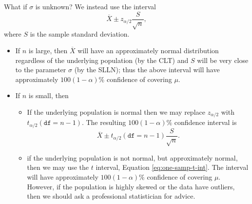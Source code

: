 \documentclass[captions=tableheading]{scrbook}
\begin{document}
\begin{rem}
What if \(\sigma\) is unknown? We instead use the interval
\begin{equation}
\overline{X}\pm z_{\alpha/2}\frac{S}{\sqrt{n}},
\end{equation}
where \(S\) is the sample standard deviation.
\begin{itemize}
\item If \(n\) is large, then \(\overline{X}\) will have an approximately normal distribution regardless of the underlying population (by the CLT) and \(S\) will be very close to the parameter \(\sigma\) (by the SLLN); thus the above interval will have approximately \(100(1-\alpha)\%\) confidence of covering \(\mu\).
\item If \(n\) is small, then
\begin{itemize}
\item If the underlying population is normal then we may replace \(z_{\alpha/2}\) with \(t_{\alpha/2}(\mathtt{df}=n-1)\). The resulting \(100(1-\alpha)\%\) confidence interval is
     \begin{equation}
     \overline{X}\pm t_{\alpha/2}(\mathtt{df}=n-1)\frac{S}{\sqrt{n}}.\label{eq:one-samp-t-int}
     \end{equation}
\item if the underlying population is not normal, but approximately normal, then we may use the \(t\) interval, Equation \ref{eq:one-samp-t-int}. The interval will have approximately \(100(1-\alpha)\%\) confidence of covering \(\mu\). However, if the population is highly skewed or the data have outliers, then we should ask a professional statistician for advice.
\end{itemize}
\end{itemize}
\end{rem}
\end{document}
